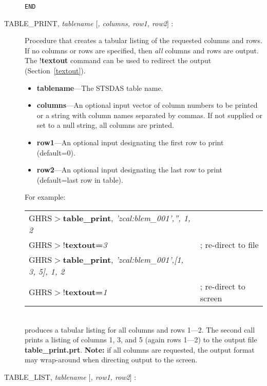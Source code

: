 \begin{description}
\begin{scriptsize}
\begin{center}
\begin{verbatim}
END                                                                             
\end{verbatim}
\end{center}
\end{scriptsize}
\newpage

\item [TABLE\_PRINT, {\it tablename $[$, columns, row1, row2$]$} : ] 

Procedure 
that creates a tabular listing of the requested columns and
rows.  If no columns or rows are specified, then  {\em all} columns
and rows are output. The {\bf $!$textout} command can be used to
redirect the output (Section~\ref{textout}). 

\begin{itemize}

\item {\bf tablename}---The STSDAS table name.

\item {\bf columns}---An optional input vector of column numbers to be 
printed or a string with column names separated by commas. If not supplied or 
set to a null string, all columns are printed.

\item {\bf row1}---An optional input designating the first row to print 
(default=0).

\item {\bf row2}---An optional input designating the last row to print 
(default=last row in table).

\end{itemize}

\noindent
For example:\\

\begin{tabular}{ll}
GHRS$>${\bf table\_print}, {\it 'zcal:blem\_001','', 1, 2} & \\
GHRS$>${\bf $!$textout=}{\it 3} & ; re-direct to file\\
GHRS$>${\bf table\_print}, {\it 'zcal:blem\_001',[1, 3, 5], 1, 2} & \\
GHRS$>${\bf $!$textout=}{\it 1} & ; re-direct to screen\\
\end{tabular}\\

\noindent
produces a tabular listing for all columns and rows 1---2.  The second call 
prints a listing of columns 1, 3, and 5 (again rows 1---2) to the output file 
{\bf table\_print.prt}. {\bf Note:} if all columns are requested, the output
format may wrap-around when directing output to the screen.
%
\item [TABLE\_LIST, {\it tablename $[$, row1, row2$]$} :] 


\end{description}
